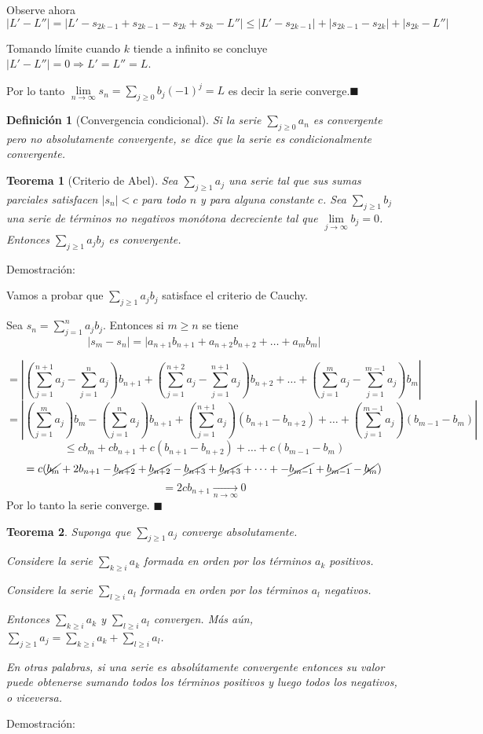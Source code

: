 \documentclass[12pt]{book}
\providecommand{\abs}[1]{\lvert#1\rvert}
\newtheorem{teo}{Teorema}[section]
\newtheorem{defi}{Definición}[section]
\begin{document}
Observe ahora $$\abs{L'-L''}=\abs{L'-s_{2k-1}+s_{2k-1}-s_{2k}+s_{2k}-L''} \le \abs{L'-s_{2k-1}}+\abs{s_{2k-1}-s_{2k}}+\abs{s_{2k}-L''}$$

Tomando límite cuando $k$ tiende a infinito se concluye $\abs{L'-L''}=0 \Rightarrow L'=L''=L$.

Por lo tanto $\lim\limits_{n \to \infty}s_n=\sum_{j \ge 0}b_j(-1)^j=L$ es decir la serie converge.$\blacksquare$

\begin{defi}[Convergencia condicional]\rm
Si la serie $\sum _{j \ge 0}a_n$ es convergente pero no absolutamente convergente, se dice que la serie es condicionalmente convergente.
\end{defi}
\begin{teo}[Criterio de Abel]\rm
Sea $\sum_{j \ge 1}a_j$ una serie tal que sus sumas parciales satisfacen $\abs{s_n}<c$ para todo $n$ y para alguna constante $c$. Sea $\sum_{j \ge 1}b_j$ una serie de términos no negativos monótona decreciente tal que $\lim\limits_{j \to \infty}b_j=0$. Entonces $\sum_{j \ge 1}a_jb_j$ es convergente.
\end{teo}
Demostración:

Vamos a probar que $\sum_{j \ge 1}a_jb_j$ satisface el criterio de Cauchy.

Sea $s_n=\sum_{j=1}^na_jb_j$. Entonces si $m \ge n$ se tiene $$\abs{s_m-s_n}=\abs{a_{n+1}b_{n+1}+a_{n+2}b_{n+2}+ \dots +a_mb_m}$$

$$=\left| \left( \sum_{j=1}^{n+1}a_j-\sum_{j=1}^{n}a_j \right)b_{n+1}+\left( \sum_{j=1}^{n+2}a_j-\sum_{j=1}^{n+1}a_j \right)b_{n+2}+ \dots + \left( \sum_{j=1}^{m}a_j-\sum_{j=1}^{m-1}a_j \right)b_m \right|$$
$$=\left| \left( \sum_{j=1}^{m}a_j \right)b_{m}-\left( \sum_{j=1}^{n}a_j \right)b_{n+1}+\left( \sum_{j=1}^{n+1}a_j \right)(b_{n+1}-b_{n+2})+\dots+ \left( \sum_{j=1}^{m-1}a_j \right)(b_{m-1}-b_m) \right|$$
$$\le cb_m+cb_{n+1}+c(b_{n+1}-b_{n+2})+\dots+c(b_{m-1}-b_{m})$$
$$=c(\cancel{b_m}+2b_{n+1}-\cancel{b_{n+2}}+\cancel{b_{n+2}}-\cancel{b_{n+3}}+\cancel{b_{n+3}}+\dots+-\cancel{b_{m-1}}+\cancel{b_{m-1}}-\cancel{b_m})$$
$$=2cb_{n+1}\xrightarrow[n \to \infty]\,{0}$$
Por lo tanto la serie converge. $\blacksquare$
\begin{teo}\label{positivosNegativos}\rm
Suponga que $\sum_{j \ge 1}a_j$ converge absolutamente.

Considere la serie $\sum_{k \ge i}a_k$ formada en orden por los términos $a_k$ positivos.

Considere la serie $\sum_{l \ge i}a_l$ formada en orden por los términos $a_l$ negativos.

Entonces $\sum_{k \ge i}a_k$ y $\sum_{l \ge i}a_l$ convergen. Más aún, $\sum_{j \ge 1}a_j=\sum_{k \ge i}a_k+\sum_{l \ge i}a_l$.

En otras palabras, si una serie es absolútamente convergente entonces su valor puede obtenerse sumando todos los términos positivos y luego todos los negativos, o viceversa.
\end{teo}
Demostración:
\end{document}
